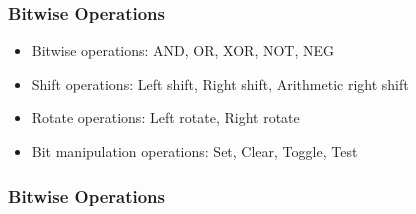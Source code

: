 \begin{frame}
    \frametitle{Bitwise Operations}
    \begin{itemize}
        \item Bitwise operations: AND, OR, XOR, NOT, NEG
        \item Shift operations: Left shift, Right shift, Arithmetic right shift
        \item Rotate operations: Left rotate, Right rotate
        \item Bit manipulation operations: Set, Clear, Toggle, Test
    \end{itemize}
\end{frame}

\begin{frame}
    \frametitle{Bitwise Operations}
\end{frame}